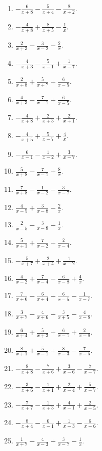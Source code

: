 \documentclass[11pt,oneside]{book}
\begin{document}
\begin{enumerate}[leftmargin=*,label=\textbf{S\arabic*.},itemsep=0.45\baselineskip]
\item $\displaystyle - \frac{6}{x + 8} - \frac{5}{x + 4} - \frac{8}{x + 2}$.
\item $\displaystyle - \frac{4}{x + 8} + \frac{8}{x + 5} - \frac{1}{x}$.
\item $\displaystyle \frac{2}{x + 3} - \frac{3}{x - 2} - \frac{2}{x}$.
\item $\displaystyle - \frac{4}{x + 3} - \frac{5}{x - 1} + \frac{1}{x - 7}$.
\item $\displaystyle \frac{2}{x + 8} + \frac{5}{x + 7} + \frac{6}{x - 5}$.
\item $\displaystyle \frac{4}{x + 3} - \frac{7}{x - 1} + \frac{6}{x - 5}$.
\item $\displaystyle - \frac{4}{x + 8} + \frac{2}{x + 3} + \frac{2}{x + 1}$.
\item $\displaystyle - \frac{4}{x + 5} + \frac{5}{x - 7} + \frac{4}{x}$.
\item $\displaystyle - \frac{6}{x - 1} - \frac{1}{x - 2} + \frac{3}{x - 7}$.
\item $\displaystyle \frac{5}{x + 8} - \frac{7}{x - 1} + \frac{8}{x}$.
\item $\displaystyle \frac{7}{x + 8} - \frac{1}{x - 2} - \frac{3}{x - 7}$.
\item $\displaystyle \frac{4}{x - 5} + \frac{3}{x - 8} - \frac{2}{x}$.
\item $\displaystyle \frac{2}{x - 5} - \frac{3}{x - 8} + \frac{1}{x}$.
\item $\displaystyle \frac{5}{x + 1} + \frac{7}{x - 2} + \frac{2}{x - 4}$.
\item $\displaystyle - \frac{5}{x + 7} + \frac{2}{x + 4} + \frac{1}{x - 2}$.
\item $\displaystyle \frac{4}{x - 2} + \frac{7}{x - 4} - \frac{6}{x - 8} + \frac{4}{x}$.
\item $\displaystyle \frac{7}{x + 6} - \frac{6}{x + 4} + \frac{6}{x - 5} - \frac{1}{x - 7}$.
\item $\displaystyle \frac{3}{x + 7} - \frac{4}{x + 6} + \frac{3}{x + 5} - \frac{4}{x - 8}$.
\item $\displaystyle \frac{6}{x + 4} + \frac{5}{x + 3} + \frac{6}{x - 1} + \frac{2}{x - 8}$.
\item $\displaystyle \frac{8}{x + 1} + \frac{5}{x - 1} + \frac{8}{x - 3} - \frac{7}{x - 5}$.
\item $\displaystyle - \frac{8}{x + 8} - \frac{7}{x + 6} + \frac{3}{x - 6} - \frac{7}{x - 7}$.
\item $\displaystyle - \frac{3}{x + 6} - \frac{1}{x + 1} + \frac{2}{x - 4} + \frac{5}{x - 7}$.
\item $\displaystyle - \frac{7}{x + 7} - \frac{1}{x + 3} + \frac{4}{x - 1} + \frac{2}{x - 5}$.
\item $\displaystyle - \frac{8}{x + 4} - \frac{6}{x - 1} + \frac{1}{x - 3} - \frac{6}{x - 6}$.
\item $\displaystyle \frac{1}{x + 7} - \frac{4}{x - 3} + \frac{3}{x - 7} - \frac{1}{x}$.
\end{enumerate}
\end{document}
